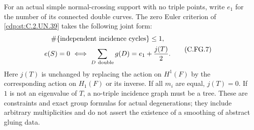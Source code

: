 \begin{proposition}
For an actual simple normal-crossing support with no triple points,
write $e_1$ for the number of its connected double curves. The zero
Euler criterion of \ref{cdp:st:C.2.UN.39} takes the following joint form:
\[
 \begin{gathered}
 \#\{
      \text{independent incidence cycles}\}\le1,\\
 e(S)=0\ \Longleftrightarrow\
       \sum_{D\ {\rm double}}g(D)=e_1+\frac{j(T)}2 .
 \end{gathered}
                                                        \tag{C.FG.7}\label{cdp:eq:C.FG.7}
\]
Here $j(T)$ is unchanged by replacing the action on $H^1(F)$ by
the corresponding action on $H_1(F)$ or its inverse. If all $m_i$
are equal, $j(T)=0$. If $1$ is not an eigenvalue of $T$, a
no-triple incidence graph must be a tree.
These are constraints and exact group formulas
for actual degenerations; they include arbitrary multiplicities
and do not assert the existence of a smoothing of abstract gluing data.
\end{proposition}

